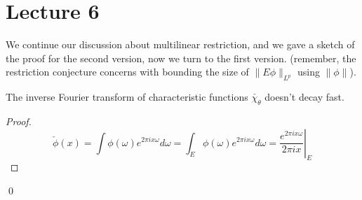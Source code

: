 \section*{Lecture 6}
We continue our discussion about multilinear restriction, and we gave a sketch of the proof for the second version, now we turn to the first version. (remember, the restriction conjecture concerns with bounding the size of $\|E\phi\|_{L^p}$ using $\|\phi\|$).
\begin{proposition}
    The inverse Fourier transform of characteristic functions $\check{\chi_\theta}$ doesn't decay fast. 
\end{proposition}
\begin{proof}
\begin{equation*}
    \check{\phi}(x)=\int\phi(\omega)e^{2\pi ix\omega}d\omega=\int_E\phi(\omega)e^{2\pi ix\omega}d\omega=\left.\frac{e^{2\pi ix\omega}}{2\pi ix}\right\vert_E
\end{equation*}
\end{proof}
\qed

